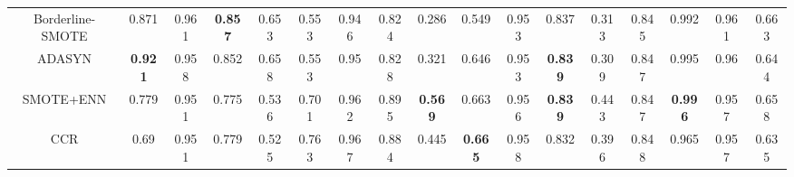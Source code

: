 \documentclass[runningheads]{llncs}
\begin{document}
\begin{table}[htbp]
{\begin{tabular}{@{}ccccccccccccccccc@{}}
          Borderline-SMOTE                                & 0.871                            & 0.961                                        & \textbf{0.857}             & 0.653                         & 0.553                            & 0.946                                        & 0.824                      & 0.286                         & 0.549                            & 0.953                                        & 0.837                      & 0.313                         & 0.845                            & 0.992                                        & 0.961                      & 0.663                         \\
          ADASYN                                          & \textbf{0.921}                   & 0.958                                        & 0.852                      & 0.658                         & 0.553                            & 0.95                                         & 0.828                      & 0.321                         & 0.646                            & 0.953                                        & \textbf{0.839}             & 0.309                         & 0.847                            & 0.995                                        & 0.96                       & 0.644                         \\
          SMOTE+ENN                                       & 0.779                            & 0.951                                        & 0.775                      & 0.536                         & 0.701                            & 0.962                                        & 0.895                      & \textbf{0.569}                & 0.663                            & 0.956                                        & \textbf{0.839}             & 0.443                         & 0.847                            & \textbf{0.996}                               & 0.957                      & 0.658                         \\
          CCR                                             & 0.69                             & 0.951                                        & 0.779                      & 0.525                         & 0.763                            & 0.967                                        & 0.884                      & 0.445                         & \textbf{0.665}                   & 0.958                                        & 0.832                      & 0.396                         & 0.848                            & 0.965                                        & 0.957                      & 0.635                         \\

\end{tabular}}
\end{table}
\end{document}
